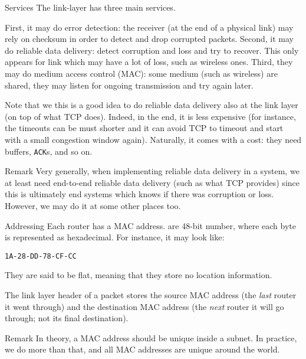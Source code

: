 \documentclass[a4paper]{article}
\begin{document}
\begin{parag}{Services}
    The link-layer has three main services.

    First, it may do error detection: the receiver (at the end of a physical link) may rely on checksum in order to detect and drop corrupted packets. Second, it may do reliable data delivery: detect corruption and loss and try to recover. This only appears for link which may have a lot of loss, such as wireless ones. Third, they may do medium access control (MAC): some medium (such as wireless) are shared, they may listen for ongoing transmission and  try again later.

    Note that we this is a good idea to do reliable data delivery also at the link layer (on top of what TCP does). Indeed, in the end, it is less expensive (for instance, the timeouts can be must shorter and it can avoid TCP to timeout and start with a small congestion window again). Naturally, it comes with a cost: they need buffers, \texttt{ACK}s, and so on.

    \begin{subparag}{Remark}
        Very generally, when implementing reliable data delivery in a system, we at least need end-to-end reliable data delivery (such as what TCP provides) since this is ultimately end systems which knows if there was corruption or loss. However, we may do it at some other places too.
    \end{subparag}
\end{parag}

\begin{parag}{Addressing}
    Each router has a MAC address.  are 48-bit number, where each byte is represented as hexadecimal. For instance, it may look like:
    \begin{center}
        \texttt{1A-28-DD-78-CF-CC}
    \end{center}

    They are said to be flat, meaning that they store no location information.

    The link layer header of a packet stores the source MAC address (the \textit{last} router it went through) and the destination MAC address (the \textit{next} router it will go through; not its final destination).

    \begin{subparag}{Remark}
        In theory, a MAC address should be unique inside a subnet. In practice, we do more than that, and all MAC addresses are unique around the world.
    \end{subparag}
\end{parag}
\end{document}
